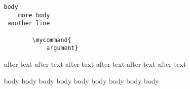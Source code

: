 \begin{verbatim}
body
    more body
 another line

        \mycommand{
            argument}
    \end{verbatim}

after text after text 
after text after text 
after text after text 
\begin{not}
	body body body
	body body body
	body body body
\end{not}
